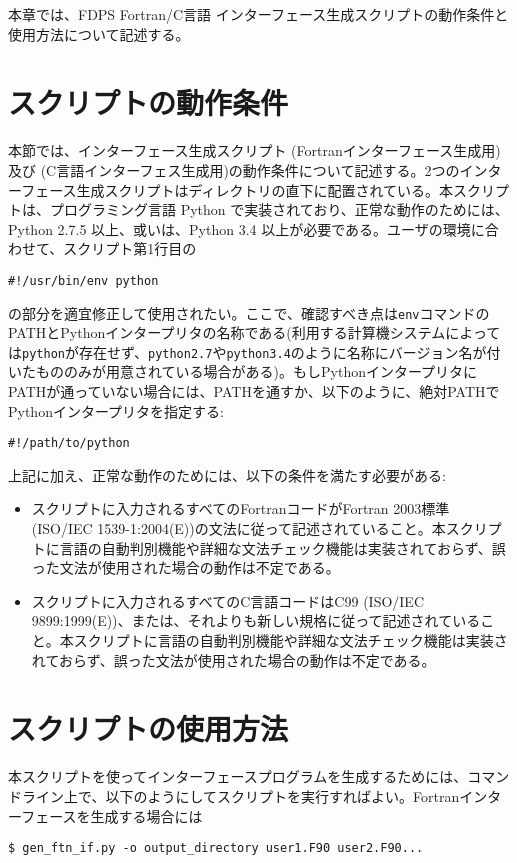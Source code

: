 本章では、FDPS Fortran/C言語 インターフェース生成スクリプトの動作条件と使用方法について記述する。

\section{スクリプトの動作条件}
本節では、インターフェース生成スクリプト (Fortranインターフェース生成用) 及び  (C言語インターフェス生成用)の動作条件について記述する。2つのインターフェース生成スクリプトはディレクトリの直下に配置されている。本スクリプトは、プログラミング言語 Python で実装されており、正常な動作のためには、Python 2.7.5 以上、或いは、Python 3.4 以上が必要である。ユーザの環境に合わせて、スクリプト第1行目の
\begin{Verbatim}[commandchars=\\\{\}]
#!/usr/bin/env python
\end{Verbatim}
の部分を適宜修正して使用されたい。ここで、確認すべき点は\texttt{env}コマンドのPATHとPythonインタープリタの名称である(利用する計算機システムによっては\texttt{python}が存在せず、\texttt{python2.7}や\texttt{python3.4}のように名称にバージョン名が付いたもののみが用意されている場合がある)。もしPythonインタープリタにPATHが通っていない場合には、PATHを通すか、以下のように、絶対PATHでPythonインタープリタを指定する:
\begin{Verbatim}[commandchars=\\\{\}]
#!/path/to/python
\end{Verbatim}

上記に加え、正常な動作のためには、以下の条件を満たす必要がある:
\begin{itemize}[leftmargin=*,itemsep=-1ex]
\item スクリプトに入力されるすべてのFortranコードがFortran 2003標準 (ISO/IEC 1539-1:2004(E))の文法に従って記述されていること。本スクリプトに言語の自動判別機能や詳細な文法チェック機能は実装されておらず、誤った文法が使用された場合の動作は不定である。
\item スクリプトに入力されるすべてのC言語コードはC99 (ISO/IEC 9899:1999(E))、または、それよりも新しい規格に従って記述されていること。本スクリプトに言語の自動判別機能や詳細な文法チェック機能は実装されておらず、誤った文法が使用された場合の動作は不定である。
\end{itemize}

\section{スクリプトの使用方法}
本スクリプトを使ってインターフェースプログラムを生成するためには、コマンドライン上で、以下のようにしてスクリプトを実行すればよい。Fortranインターフェースを生成する場合には
\begin{screen}
\begin{Verbatim}[commandchars=\\\{\}]
$ gen_ftn_if.py -o output_directory user1.F90 user2.F90... 
\end{Verbatim}
\end{screen}

